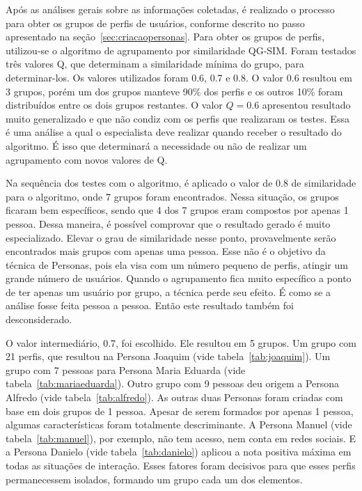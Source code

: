 Após as análises gerais sobre as informações coletadas, é realizado o processo para obter os grupos de perfis de usuários, conforme descrito no passo apresentado na seção~\ref{sec:criacaopersonas}. Para obter os grupos de perfis, utilizou-se o algoritmo de agrupamento por similaridade QG-SIM. Foram testados três valores Q, que determinam a similaridade mínima do grupo, para determinar-los. Os valores utilizados foram 0.6, 0.7 e 0.8. O valor 0.6 resultou em 3 grupos, porém um dos grupos manteve 90\% dos perfis e os outros 10\% foram distribuídos entre os dois grupos restantes. O valor $Q = 0.6$ apresentou resultado muito generalizado e que não condiz com os perfis que realizaram os testes. Essa é uma análise a qual o especialista deve realizar quando receber o resultado do algoritmo. É isso que determinará a necessidade ou não de realizar um agrupamento com novos valores de Q.

Na sequência dos testes com o algoritmo, é aplicado o valor de 0.8 de similaridade para o algoritmo, onde 7 grupos foram encontrados. Nessa situação, os grupos ficaram bem específicos, sendo que 4 dos 7 grupos eram compostos por apenas 1 pessoa. Dessa maneira, é possível comprovar que o resultado gerado é muito especializado. Elevar o grau de similaridade nesse ponto, provavelmente serão encontrados mais grupos com apenas uma pessoa. Esse não é o objetivo da técnica de Personas, pois ela visa com um número pequeno de perfis, atingir um grande número de usuários. Quando o agrupamento fica muito específico a ponto de ter apenas um usuário por grupo, a técnica perde seu efeito. É como se a análise fosse feita pessoa a pessoa. Então este resultado também foi desconsiderado.

O valor intermediário, 0.7, foi escolhido. Ele resultou em 5 grupos. Um grupo com 21 perfis, que resultou na Persona Joaquim (vide tabela~\ref{tab:joaquim}). Um grupo com 7 pessoas para Persona Maria Eduarda (vide tabela~\ref{tab:mariaeduarda}). Outro grupo com 9 pessoas deu origem a Persona Alfredo (vide tabela~\ref{tab:alfredo}). As outras duas Personas foram criadas com base em dois grupos de 1 pessoa. Apesar de serem formados por apenas 1 pessoa, algumas características foram totalmente descriminante. A Persona Manuel (vide tabela~\ref{tab:manuel}), por exemplo, não tem acesso, nem conta em redes sociais. E a Persona Danielo (vide tabela~\ref{tab:danielo}) aplicou a nota positiva máxima em todas as situações de interação. Esses fatores foram decisivos para que esses perfis permanecessem isolados, formando um grupo cada um dos elementos.

